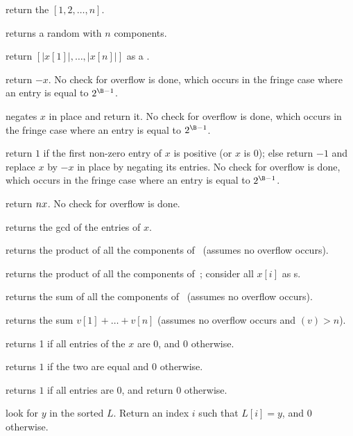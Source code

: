  return the  $[1, 2, \dots, n]$.

 returns a random  with $n$ components.

 return $[|x[1]|,\ldots,|x[n]|]$ as a .

 return $-x$. No check for overflow is done, which
occurs in the fringe case where an entry is equal to $2^{\B-1}$.

 negates $x$ in place and return it. No check
for overflow is done, which occurs in the fringe case where an entry is equal
to $2^{\B-1}$.

 return $1$ if the first non-zero entry of
$x$ is positive (or $x$ is $0$); else return $-1$ and replace $x$ by $-x$ in
place by negating its entries. No check for overflow is done, which occurs in
the fringe case where an entry is equal to $2^{\B-1}$.



 return $n\*x$. No check for overflow is
done.

 returns the gcd of the entries of $x$.


 returns the product of all the components
of~ (assumes no overflow occurs).

 returns the product of all the components
of~; consider all $x[i]$ as s.

 returns the sum of all the components
of~ (assumes no overflow occurs).

 returns the sum $v[1] + \dots + v[n]$
(assumes no overflow occurs and $(v) > n$).

 returns 1 if all entries of the  $x$ are $0$,
and $0$ otherwise.

 returns $1$ if the two  are equal
and $0$ otherwise.

 returns $1$ if all entries are $0$, and return
$0$ otherwise.

 look for $y$ in the sorted
 $L$. Return an index $i$ such that $L[i] = y$, and  $0$ otherwise.

